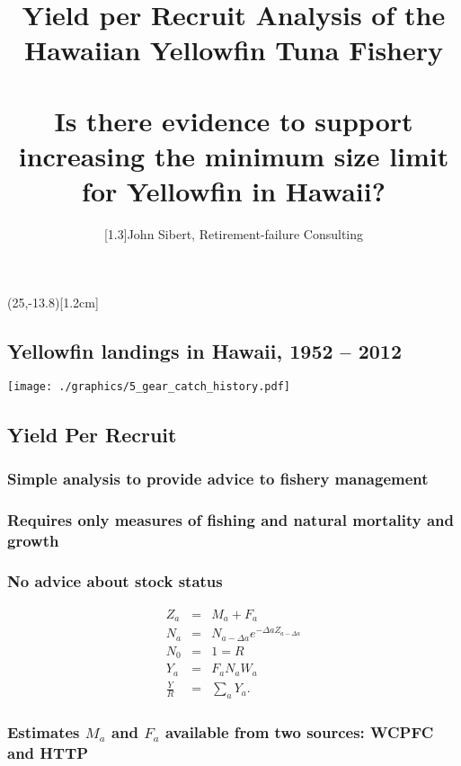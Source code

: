 \documentclass[a4paper,KOMA,landscape,titlepage]{powersem}
\begin{document}
\pageTransitionReplace
\pagecounter[on]


\freelogo(25,-13.8)[1.2cm] %

\author{\scalebox{1}[1.3]{John Sibert, Retirement-failure Consulting}} 
\title{Yield per Recruit Analysis of the Hawaiian
Yellowfin Tuna Fishery\\~\\
{\Large \color{section3}
Is there evidence to support increasing the minimum size limit for
Yellowfin in Hawaii?}}
\address{\href{mailto:sibert@hawaii.edu}{sibert@hawaii.edu}}
\begin{slide}
\maketitle
\end{slide}
\centerslidesfalse

\begin{slide}\section{Yellowfin landings in Hawaii, 1952 -- 2012}
\begin{center}
\texttt{[image: ./graphics/5\_gear\_catch\_history.pdf]}
\end{center}
\end{slide}

\begin{slide}\section{Yield Per Recruit}
\subsubsection{Simple analysis to provide advice to fishery management}
\subsubsection{Requires only measures of fishing and natural
mortality and growth}
\subsubsection{No advice about stock status}
\begin{eqnarray}
Z_a &=& M_a +F_a \\
N_a &=& N_{a-\Delta a}e^{-\Delta aZ_{a-\Delta a}}\\
N_0 &=& 1 = R\\
Y_a &=& F_aN_aW_a\\
\frac{Y}{R} &=& \sum_a Y_a.
\end{eqnarray}
\subsubsection{Estimates $M_a$ and $F_a$ available from two sources:
WCPFC and HTTP}
\end{slide}
\end{document}
